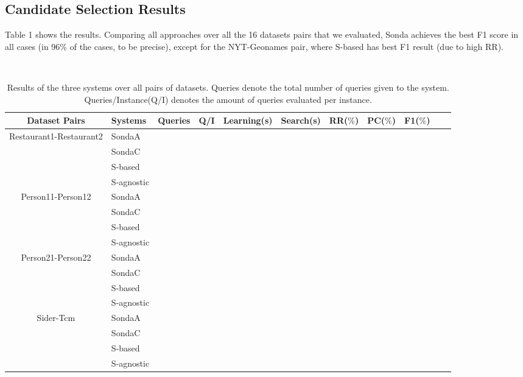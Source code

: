 \subsection{Candidate Selection Results} 
Table 1 shows the results. Comparing all approaches over all the 16 datasets pairs that we evaluated, Sonda achieves the best F1 score in all cases (in 96\% of the cases, to be precise), except for the NYT-Geonames pair, where S-based has best F1 result (due to high RR). 
 
\begin{center}
\begin{table*}[h]
\centering
\scriptsize\tt
\caption{Results of the three systems over all pairs of datasets. Queries denote the total number of queries given to the system. Queries/Instance(Q/I) denotes the amount of queries evaluated per instance.} 
    \begin{tabular}{|c|l|c|c|c|c|c|c|c|c|c|}
        \hline
        Dataset Pairs & Systems & Queries & Q/I & Learning(s) & Search(s)  & RR($\%$) & PC($\%$) &  F1($\%$) \\ \hline
 
\multirow{4}{*}{Restaurant1-Restaurant2} & SondaA           \\
											& SondaC  \\
											& S-based \\
 											& S-agnostic     \\ \hline
 											
\multirow{4}{*}{Person11-Person12} & SondaA    \\
											& SondaC  \\
											& S-based \\
 											& S-agnostic      \\ \hline

\multirow{4}{*}{Person21-Person22} & SondaA  \\
											& SondaC  \\
											& S-based \\
 											& S-agnostic       	\\ \hline 										

 \multirow{4}{*}{Sider-Tcm} & SondaA            \\
 											& SondaC  \\
											& S-based \\
 											& S-agnostic        \\ \hline
 											

\end{tabular}
\end{table*}
\end{center}

